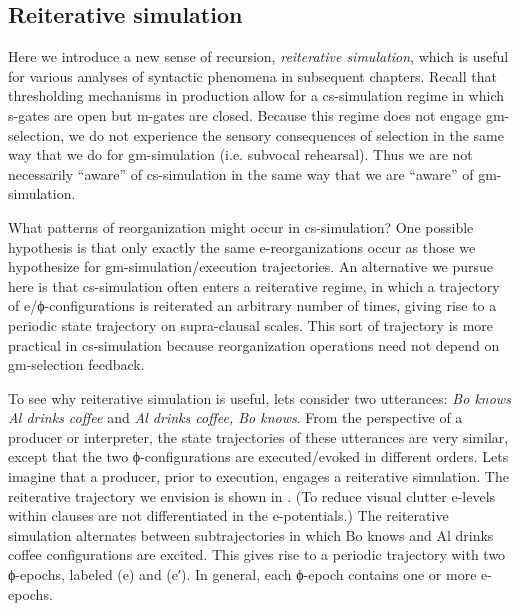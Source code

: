 \subsection{Reiterative simulation}

Here we introduce a new sense of recursion, \textit{reiterative simulation}, which is useful for various analyses of syntactic phenomena in subsequent chapters. Recall that thresholding mechanisms in production allow for a cs-simulation regime in which s-gates are open but m-gates are closed. Because this regime does not engage gm-selection, we do not experience the sensory consequences of selection in the same way that we do for gm-simulation (i.e. subvocal rehearsal). Thus we are not necessarily “aware” of cs-simulation in the same way that we are “aware” of gm-simulation.

  What patterns of reorganization might occur in cs-simulation? One possible hypothesis is that only exactly the same e-reorganizations occur as those we hypothesize for gm-simulation/execution trajectories. An alternative we pursue here is that cs-simulation often enters a reiterative regime, in which a trajectory of e/ϕ-configurations is reiterated an arbitrary number of times, giving rise to a periodic state trajectory on supra-clausal scales. This sort of trajectory is more practical in cs-simulation because reorganization operations need not depend on gm-selection feedback.

  To see why reiterative simulation is useful, lets consider two utterances: \textit{Bo knows Al drinks coffee} and \textit{Al drinks coffee, Bo knows}. From the perspective of a producer or interpreter, the state trajectories of these utterances are very similar, except that the two ϕ-configurations are executed/evoked in different orders. Lets imagine that a producer, prior to execution, engages a reiterative simulation. The reiterative trajectory we envision is shown in {}. (To reduce visual clutter e-levels within clauses are not differentiated in the e-potentials.) The reiterative simulation alternates between subtrajectories in which {\textbar}Bo knows{\textbar} and {\textbar}Al drinks coffee{\textbar} configurations are excited. This gives rise to a periodic trajectory with two ϕ-epochs,  labeled (e) and (e′). In general, each ϕ-epoch contains one or more e-epochs.

